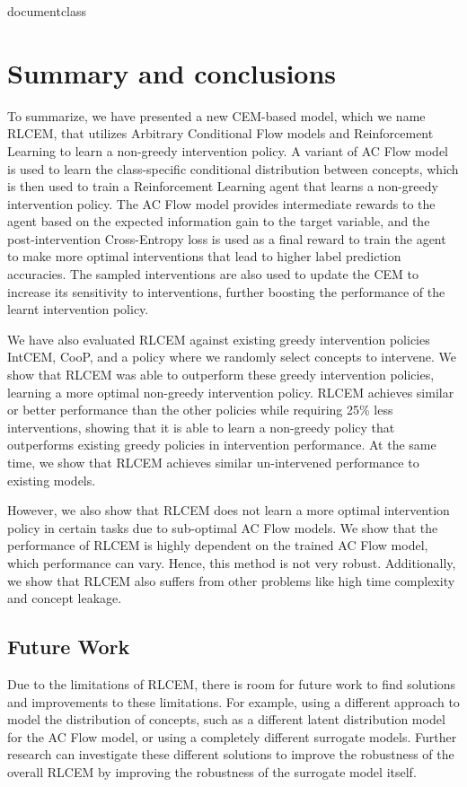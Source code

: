 \csname documentclass

\chapter{Summary and conclusions}

To summarize, we have presented a new CEM-based model,
which we name RLCEM, that utilizes Arbitrary Conditional Flow 
models and Reinforcement Learning to learn a non-greedy 
intervention policy. A variant of AC Flow model is used to 
learn the class-specific
conditional distribution between concepts, which is then used 
to train a Reinforcement Learning agent that learns
a non-greedy intervention policy. The AC Flow model 
provides intermediate rewards to the agent based on the
expected information gain to the target variable,
and the post-intervention Cross-Entropy loss is used as a final reward
to train the agent to make more optimal 
interventions that lead to 
higher label prediction accuracies. The sampled interventions
are also used to update the CEM to increase its sensitivity
to interventions, further boosting the performance of the learnt
intervention policy.

We have also evaluated RLCEM against existing greedy intervention
policies IntCEM, CooP, and a policy where we randomly select
concepts to intervene. We show that RLCEM was able to outperform 
these greedy intervention policies, learning a more optimal
non-greedy intervention policy. RLCEM achieves similar or 
better performance than the other policies while requiring
25\% less interventions, 
showing that it is able to learn a non-greedy policy that 
outperforms existing greedy policies in intervention
performance. At the same time,
we show that RLCEM achieves similar un-intervened performance
to existing models.

However, we also show that RLCEM
does not learn a more optimal intervention policy
in certain tasks due to sub-optimal AC Flow models.
We show that the performance of RLCEM is highly dependent on
the trained AC Flow model, which performance can vary. 
Hence, this method
is not very robust. Additionally, we show that 
RLCEM also suffers from other problems like 
high time complexity and concept leakage.

\section{Future Work}
Due to the limitations of RLCEM, there is room for future 
work to find solutions and improvements to these limitations.
For example, using a different approach to model
the distribution of concepts, such as 
a different latent distribution model for the AC Flow model,
or using a completely different surrogate models. Further 
research can investigate these different solutions to 
improve the robustness of the overall RLCEM 
by improving the robustness of the surrogate model itself.

